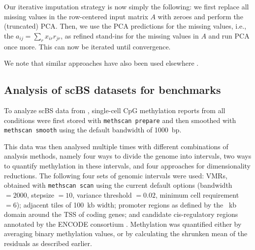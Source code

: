 \documentclass[twocolumn,10pt]{article}
\newcommand{\new}[1]{#1} %
\begin{document}
Our iterative imputation strategy is now simply the following: we first replace all missing values in the row-centered input matrix $A$ with zeroes and perform the (truncated) PCA.
Then, we use the PCA predictions for the missing values, i.e., the $a_{ij}=\sum_r x_{ir} r_{jr}$, as refined stand-ins for the missing values in $A$ and run PCA once more.
This can now be iterated until convergence.

We note that similar approaches have also been used elsewhere \citep{josse2012}.


\subsection{Analysis of scBS datasets for benchmarks}
To analyze scBS data from \citet{kremer_scnmt}, single-cell CpG methylation reports from all conditions were first stored with \texttt{methscan prepare} and then smoothed with \texttt{methscan smooth} using the default bandwidth of 1000~bp.
\new{
This data was then analysed multiple times with different combinations of analysis methods, namely four ways to divide the genome into intervals, two ways to quantify methylation in these intervals, and four approaches for dimensionality reductions.
The following four sets of genomic intervals were used:
VMRs, obtained with \texttt{methscan scan} using the current default options (bandwidth $=2000$, stepsize $=10$, variance threshold $= 0.02$, minimum cell requirement $=6$);
adjacent tiles of 100~kb width;
promoter regions as defined by the \textpm2~kb domain around the TSS of coding genes;
and candidate cis-regulatory regions annotated by the ENCODE consortium \citep{encode2020expanded}.
Methylation was quantified either by averaging binary methylation values, or by calculating the shrunken mean of the residuals as described earlier.
}
\end{document}
